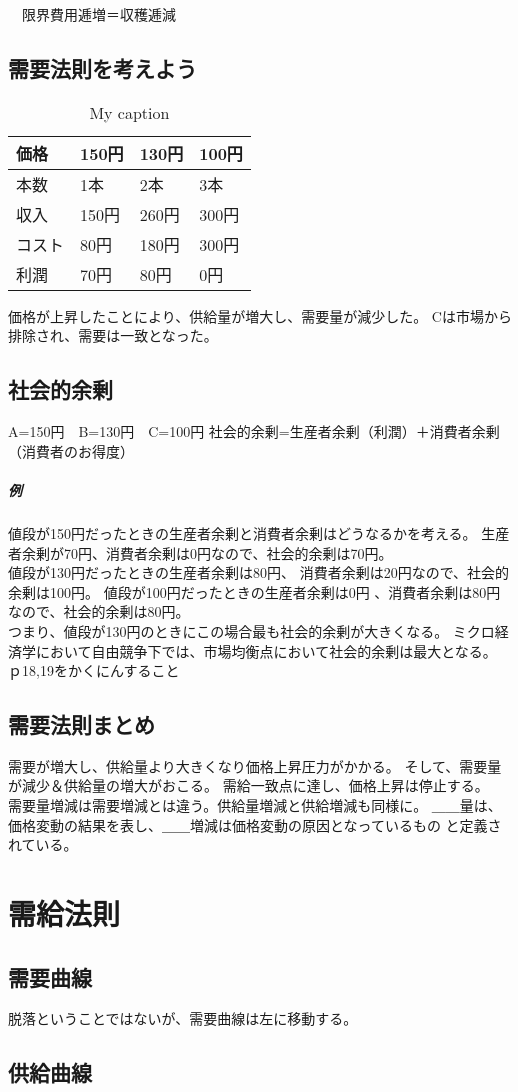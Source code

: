 \documentclass{jsarticle}
\begin{document}
　限界費用逓増＝収穫逓減

\subsection{需要法則を考えよう}
\begin{table}[]
\centering
\caption{My caption}
\label{my-label}
\begin{tabular}{l|lll}
価格  & 150円 & 130円 & 100円 \\ \hline
本数  & 1本   & 2本   & 3本   \\
収入  & 150円 & 260円 & 300円 \\
コスト & 80円  & 180円 & 300円 \\
利潤  & 70円  & 80円  & 0円
\end{tabular}
\end{table}

価格が上昇したことにより、供給量が増大し、需要量が減少した。
Cは市場から排除され、需要は一致となった。


\subsection{社会的余剰}
A=150円　B=130円　C=100円
社会的余剰=生産者余剰（利潤）＋消費者余剰（消費者のお得度）
\subparagraph{例}
値段が150円だったときの生産者余剰と消費者余剰はどうなるかを考える。
生産者余剰が70円、消費者余剰は0円なので、社会的余剰は70円。\\
値段が130円だったときの生産者余剰は80円、
消費者余剰は20円なので、社会的余剰は100円。
値段が100円だったときの生産者余剰は0円
、消費者余剰は80円なので、社会的余剰は80円。\\
つまり、値段が130円のときにこの場合最も社会的余剰が大きくなる。
ミクロ経済学において自由競争下では、市場均衡点において社会的余剰は最大となる。
ｐ18,19をかくにんすること

\subsection{需要法則まとめ}
需要が増大し、供給量より大きくなり価格上昇圧力がかかる。
そして、需要量が減少＆供給量の増大がおこる。
需給一致点に達し、価格上昇は停止する。　\\
需要量増減は需要増減とは違う。供給量増減と供給増減も同様に。
＿＿量は、価格変動の結果を表し、＿＿増減は価格変動の原因となっているもの
と定義されている。



\section{需給法則}
\subsection{需要曲線}
脱落ということではないが、需要曲線は左に移動する。
\subsection{供給曲線}
\end{document}
